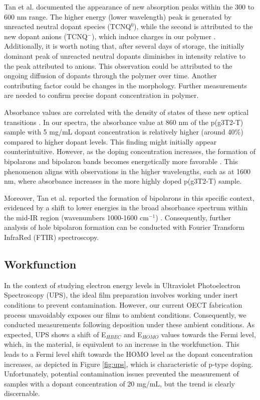Tan et al. documented the appearance of new absorption peaks within the 300 to 600 nm range. The higher energy (lower wavelength) peak is generated by unreacted neutral dopant species (TCNQ$^{0}$), while the second is attributed to the new dopant anions (TCNQ$^{-}$), which induce charges in our polymer \cite{tanTuningOrganicElectrochemical2022}. Additionally, it is worth noting that, after several days of storage, the initially dominant peak of unreacted neutral dopants diminishes in intensity relative to the peak attributed to anions. This observation could be attributed to the ongoing diffusion of dopants through the polymer over time. Another contributing factor could be changes in the morphology. Further measurements are needed to confirm precise dopant concentration in polymer. 

Absorbance values are correlated with the density of states of these new optical transitions \cite{bredasPolaronsBipolaronsSolitons1985}. In our spectra, the absorbance value at 860 nm of the p(g3T2-T) sample with 5 mg/mL dopant concentration is relatively higher (around 40\%) compared to higher dopant levels. This finding might initially appear counterintuitive. However, as the doping concentration increases, the formation of bipolarons and bipolaron bands becomes energetically more favorable \cite{enenglDopinginducedAbsorptionBands2016}. This phenomenon aligns with observations in the higher wavelengths, such as at 1600 nm, where absorbance increases in the more highly doped p(g3T2-T) sample.

Moreover, Tan et al. reported the formation of bipolarons in this specific context, evidenced by a shift to lower energies in the broad absorbance spectrum within the mid-IR region (wavenumbers 1000-1600 cm$^{-1}$) \cite{tanTuningOrganicElectrochemical2022}. Consequently, further analysis of hole bipolaron formation can be conducted with Fourier Transform InfraRed (FTIR) spectroscopy.
 
\subsection{Workfunction}

In the context of studying electron energy levels in Ultraviolet Photoelectron Spectroscopy (UPS), the ideal film preparation involves working under inert conditions to prevent contamination. However, our current OECT fabrication process unavoidably exposes our films to ambient conditions. Consequently, we conducted measurements following deposition under these ambient conditions. As expected, UPS shows a shift of E$_{HBEC}$ and E$_{HOMO}$ values towards the Fermi level, which, in the material, is equivalent to an increase in the workfunction. This leads to a Fermi level shift towards the HOMO level as the dopant concentration increases, as depicted in Figure \ref{fig:ups}, which is characteristic of p-type doping. Unfortunately, potential contamination issues prevented the measurement of samples with a dopant concentration of 20 mg/mL, but the trend is clearly discernable.

